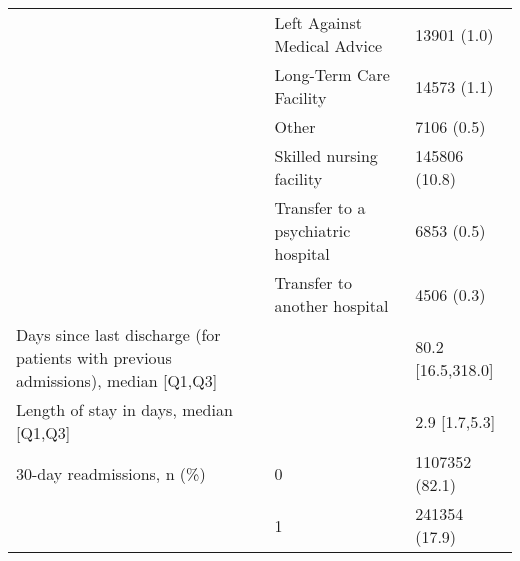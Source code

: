 \begin{tabular}{lll}
                           & Left Against Medical Advice &        13901 (1.0) \\
                           & Long-Term Care Facility &        14573 (1.1) \\
                           & Other &         7106 (0.5) \\
                           & Skilled nursing facility &      145806 (10.8) \\
                           & Transfer to a psychiatric hospital &         6853 (0.5) \\
                           & Transfer to another hospital &         4506 (0.3) \\
Days since last discharge (for patients with previous admissions), median [Q1,Q3] &   &  80.2 [16.5,318.0] \\
Length of stay in days, median [Q1,Q3] &   &      2.9 [1.7,5.3] \\
30-day readmissions, n (\%) & 0 &     1107352 (82.1) \\
                           & 1 &      241354 (17.9) \\
\bottomrule
\end{tabular}
